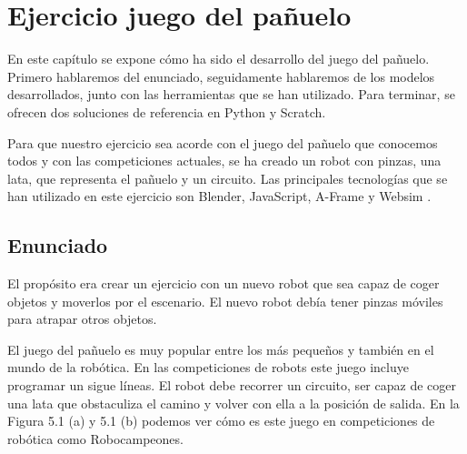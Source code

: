 \chapter{Ejercicio juego del pañuelo} \label{gripper}
En este capítulo se expone cómo ha sido el desarrollo del juego del pañuelo. Primero hablaremos del enunciado, seguidamente hablaremos de los modelos desarrollados, junto con las herramientas que se han utilizado. Para terminar, se ofrecen dos soluciones de referencia en Python y Scratch.

Para que nuestro ejercicio sea acorde con el juego del pañuelo que conocemos todos y con las competiciones actuales, se ha creado un robot con pinzas, una lata, que representa el pañuelo y un circuito. Las principales tecnologías que se han utilizado en este ejercicio son Blender, JavaScript, A-Frame y Websim .


\section{Enunciado}
El propósito era crear un ejercicio con un nuevo robot que sea capaz de coger objetos y moverlos por el escenario. El nuevo robot debía tener pinzas móviles para atrapar otros objetos. 

El juego del pañuelo es muy popular entre los más pequeños y también en el mundo de la robótica. En las competiciones de robots este juego incluye programar un sigue líneas. El robot debe recorrer un circuito, ser capaz de coger una lata que obstaculiza el camino y volver con ella a la posición de salida. En la Figura 5.1 (a) y 5.1 (b) podemos ver cómo es este juego en competiciones de robótica como Robocampeones.

